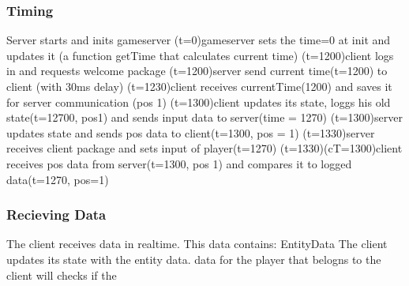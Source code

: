 \documentclass[parskip=full]{scrartcl}
\begin{document}
\subsubsection{Timing}
Server starts and inits gameserver
(t=0)gameserver sets the time=0 at init and updates it 
(a function getTime that calculates current time)\newline
(t=1200)client logs in and requests welcome package\newline
(t=1200)server send current time(t=1200) to client (with 30ms delay)\newline
(t=1230)client receives currentTime(1200) and saves it for server communication (pos 1)\newline
(t=1300)client updates its state, loggs his old state(t=12700, pos1) and sends input data to server(time = 1270)\newline
(t=1300)server updates state and sends pos data to client(t=1300, pos = 1)\newline
(t=1330)server receives client package and sets input of player(t=1270)\newline
(t=1330)(cT=1300)client receives pos data from server(t=1300, pos 1) and compares it to logged data(t=1270, pos=1)




\subsubsection{Recieving Data}
The client receives data in realtime. This data contains:
EntityData
The client updates its state with the entity data.
data for the player that belogns to the client will checks if the 
\end{document}
